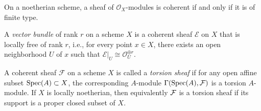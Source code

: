 \documentclass[12pt]{article}
\begin{document}
\begin{remark}
    On a noetherian scheme, a sheaf of $\mathcal{O}_X$-modules is coherent if and only if it is of finite type.
\end{remark}

\begin{definition}
    A \textit{vector bundle} of rank $r$ on a scheme $X$ is a coherent sheaf $\mathcal{E}$ on $X$ that is locally free of rank $r$, i.e., for every point $x \in X$, there exists an open neighborhood $U$ of $x$ such that $\mathcal{E}|_U \cong \mathcal{O}_U^{\oplus r}$.
\end{definition}

\begin{definition}
    A coherent sheaf $\mathcal{F}$ on a scheme $X$ is called a \textit{torsion sheaf} if for any open affine subset $\operatorname{Spec}(A) \subset X$, the corresponding $A$-module $\Gamma(\operatorname{Spec}(A), \mathcal{F})$ is a torsion $A$-module. If $X$ is locally noetherian, then equivalently ${\mathcal{F}}$ is a torsion sheaf if its support is a proper closed subset of $X$.
\end{definition}
\end{document}

